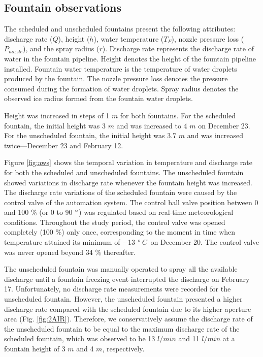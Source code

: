 \documentclass[tc, manuscript]{copernicus}
\begin{document}
\subsection{Fountain observations}

The scheduled and unscheduled fountains present the following attributes: discharge rate ($Q$), height ($h$), water
temperature ($T_F$), nozzle pressure loss ($P_{nozzle}$), and the spray radius ($r$). Discharge rate represents
the discharge rate of water in the fountain pipeline. Height denotes the height of the fountain pipeline
installed. Fountain water temperature is the temperature of water droplets produced by the fountain. The nozzle
pressure loss denotes the pressure consumed during the formation of water droplets. Spray radius denotes the
observed ice radius formed from the fountain water droplets.

Height was increased in steps of 1 $m$ for both fountains. For the scheduled fountain, the
initial height was 3 $m$ and was increased to 4 $m$ on December 23. For the unscheduled
fountain, the initial height was 3.7 $m$ and was increased twice---December
23 and February 12.

Figure \ref{fig:aws} shows the temporal variation in temperature and discharge rate for both the scheduled and
unscheduled fountains. The unscheduled fountain showed variations in discharge rate whenever the fountain height
was increased. The discharge rate variations of the scheduled fountain were caused by the control valve of the
automation system. The control ball valve position between 0 and 100 \% (or 0 to 90 $^{\circ}$) was regulated
based on real-time meteorological conditions. Throughout the study period, the control valve was opened
completely (100 \%) only once, corresponding to the moment in time when temperature attained its minimum of $-$13
$^{\circ} \, C$ on December 20. The control valve was never opened beyond 34 \% thereafter.  

The unscheduled fountain was manually operated to spray all the available discharge until a fountain freezing
event interrupted the discharge on February 17. Unfortunately, no discharge rate measurements were recorded
for the unscheduled fountain. However, the unscheduled fountain presented a higher discharge rate
compared with the scheduled fountain due to its higher aperture area (Fig. \ref{fig:2AIR}). Therefore, we
conservatively assume the discharge rate of the unscheduled fountain to be equal to the maximum discharge rate
of the scheduled fountain, which was observed to be 13 $l/min$ and 11 $l/min$ at a fountain height of 3 $m$ and 4
$m$, respectively.
\end{document}

